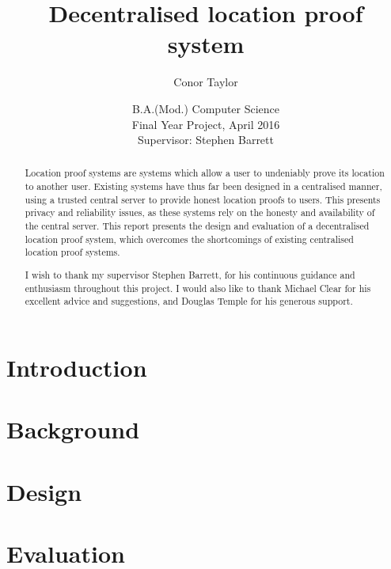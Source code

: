 \documentclass[12pt]{report}
\title{Decentralised location proof system}
\author{Conor Taylor}
\date{
	B.A.(Mod.) Computer Science\\
	Final Year Project, April 2016\\
	Supervisor: Stephen Barrett
}
\begin{document}
\onehalfspacing

\maketitle

\renewcommand{\abstractname}{Abstract}
\begin{abstract}
Location proof systems are systems which allow a user to undeniably prove its location to another user. Existing systems have thus far been designed in a centralised manner, using a trusted central server to provide honest location proofs to users. This presents privacy and reliability issues, as these systems rely on the honesty and availability of the central server. This report presents the design and evaluation of a decentralised location proof system, which overcomes the shortcomings of existing centralised location proof systems.
\end{abstract}

\renewcommand{\abstractname}{Acknowledgements}
\begin{abstract}
I wish to thank my supervisor Stephen Barrett, for his continuous guidance and enthusiasm throughout this project. I would also like to thank Michael Clear for his excellent advice and suggestions, and Douglas Temple for his generous support.
\end{abstract}

\tableofcontents
\newpage

\listoffigures
\newpage

\chapter{Introduction} \label{ch:introduction}


\chapter{Background} \label{ch:background}


\chapter{Design} \label{ch:design}


\chapter{Evaluation} \label{ch:evaluation}

\end{document}
